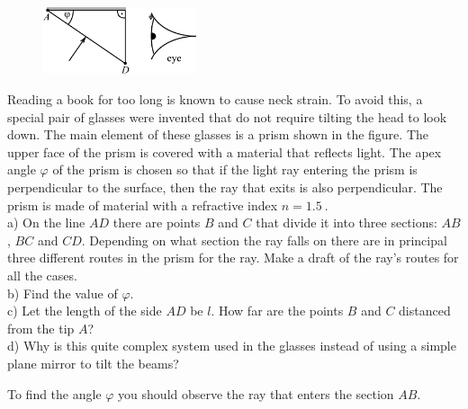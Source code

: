 \begin{figure}
  \begin{center}
    \includegraphics[width=0.4\textwidth]{2014-v3g-04-periskoopprillid_yl_joonis_ing}
  \end{center}
\end{figure}
Reading a book for too long is known to cause neck strain. To avoid this, a special pair of glasses were invented that do not require tilting the head to look down. The main element of these glasses is a prism shown in the figure. The upper face of the prism is covered with a material that reflects light. The apex angle $\varphi$ of the prism is chosen so that if the light ray entering the prism is perpendicular to the surface, then the ray that exits is also perpendicular. The prism is made of material with a refractive index $n=\SI{1,5}{}$.\\
a) On the line $AD$ there are points $B$ and $C$ that divide it into three sections: $AB$, $BC$ and $CD$. Depending on what section the ray falls on there are in principal three different routes in the prism for the ray. Make a draft of the ray’s routes for all the cases. \\
b) Find the value of $\varphi$.\\
c) Let the length of the side $AD$ be $l$. How far are the points $B$ and $C$ distanced from the tip $A$?\\
d) Why is this quite complex system used in the glasses instead of using a simple plane mirror to tilt the beams?

\hinteng
To find the angle $\varphi$ you should observe the ray that enters the section $AB$.

